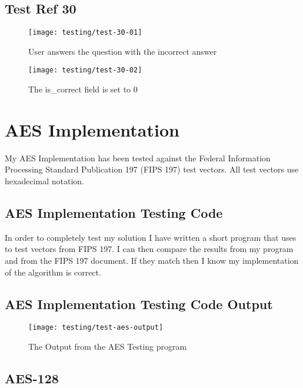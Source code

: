 \subsection{Test Ref 30}

\begin{figure}[H]
\centering
\texttt{[image: testing/test-30-01]}
\caption{User answers the question with the incorrect answer}
\label{test-30-01}
\end{figure}

\begin{figure}[H]
\centering
\texttt{[image: testing/test-30-02]}
\caption{The is\_correct field is set to 0}
\label{test-30-01}
\end{figure}

\newpage
\section{AES Implementation}

My AES Implementation has been tested against the Federal Information Processing Standard Publication 197 (FIPS 197) test vectors. All test vectors use hexadecimal notation.

\subsection{AES Implementation Testing Code}

In order to completely test my solution I have written a short program that uses to test vectors from FIPS 197. I can then compare the results from my program and from the FIPS 197 document. If they match then I know my implementation of the algorithm is correct.



\subsection{AES Implementation Testing Code Output}

\begin{figure}[H]
\centering
\texttt{[image: testing/test-aes-output]}
\caption{The Output from the AES Testing program}
\label{test-aes-output}
\end{figure}

\subsection{AES-128}

